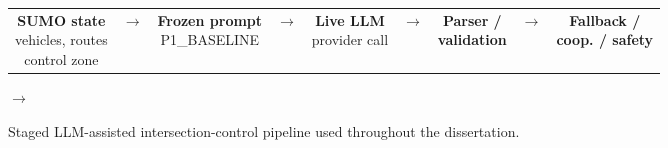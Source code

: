 \documentclass[letterpaper,10pt,conference]{ieeeconf}
\begin{document}
\begin{figure}[t]

\centering

\setlength{\fboxsep}{4pt}

\renewcommand{\arraystretch}{1.15}

\begin{tabular}{c c c c c c c c c}

\fbox{\parbox[c][1.15cm][c]{1.65cm}{\centering \textbf{SUMO state}\\vehicles, routes\\control zone}} &

$\rightarrow$ &

\fbox{\parbox[c][1.15cm][c]{1.70cm}{\centering \textbf{Frozen prompt}\\P1\_BASELINE}} &

$\rightarrow$ &

\fbox{\parbox[c][1.15cm][c]{1.55cm}{\centering \textbf{Live LLM}\\provider call}} &

$\rightarrow$ &

\fbox{\parbox[c][1.15cm][c]{1.70cm}{\centering \textbf{Parser /}\\\textbf{validation}}} &

$\rightarrow$ &

\fbox{\parbox[c][1.15cm][c]{1.80cm}{\centering \textbf{Fallback /}\\\textbf{coop. / safety}}}

\end{tabular}



\vspace{0.5em}




\hspace{0.5em}

$\rightarrow$

\hspace{0.5em}


\caption{Staged LLM-assisted intersection-control pipeline used throughout the dissertation.}

\label{fig:architecture}

\end{figure}
\end{document}
